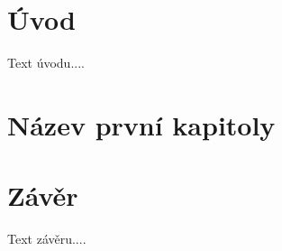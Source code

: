 \documentclass[a4paper,11pt]{book}
\begin{document}
\newpage

\null\newpage

\pagestyle{plain}

\tableofcontents

\newpage

\chapter*{Úvod}

Text úvodu....

\chapter{Název první kapitoly}

\pagestyle{headings}

\chapter*{Závěr}

\pagestyle{plain}

Text závěru....

\nocite{*}
\printbibliography[title=Literatura]
\end{document}
